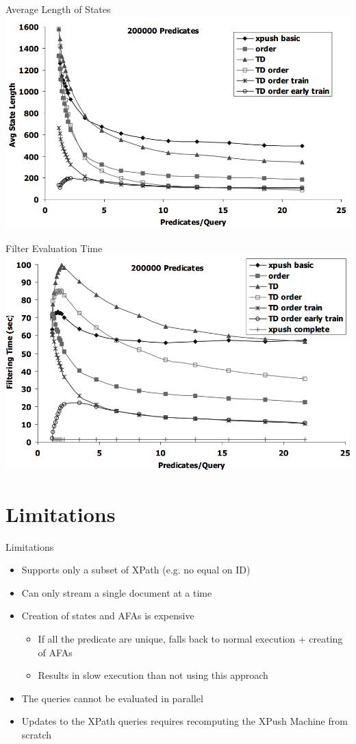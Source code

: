 \documentclass[mathserif,serif]{beamer}
\begin{document}
\begin{frame}{Average Length of States}
  \includegraphics[width=\textwidth]{avglen}
\end{frame}

\begin{frame}{Filter Evaluation Time}
  \includegraphics[width=\textwidth]{filtertime}
\end{frame}

\section{Limitations}
\begin{frame}{Limitations}
  \begin{itemize}
    \item Supports only a subset of XPath (e.g. no equal on ID)
    \item Can only stream a single document at a time
    \item Creation of states and AFAs is expensive
    \begin{itemize}
      \item If all the predicate are unique, falls back to normal execution + creating of AFAs
      \item Results in slow execution than not using this approach
    \end{itemize}
    \item The queries cannot be evaluated in parallel
    \item Updates to the XPath queries requires recomputing the XPush Machine from scratch
  \end{itemize}
\end{frame}
\end{document}
